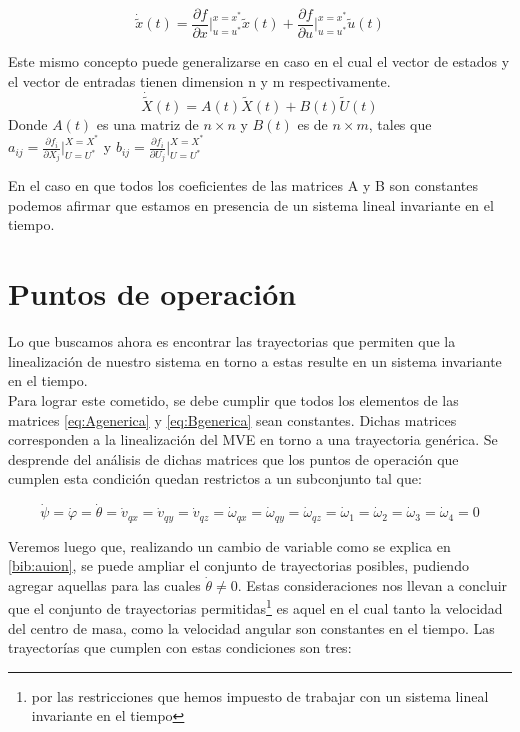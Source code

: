 \documentclass[main]{subfiles}
\begin{document}
\begin{equation}
\dot{\tilde{x}}(t)=\frac{\partial f}{\partial x}\vert_{u=u^*}^{x=x^*}\tilde{x}(t)+\frac{\partial f}{\partial u}\vert_{u=u^*}^{x=x^*}\tilde{u}(t)
\end{equation}

Este mismo concepto puede generalizarse en caso en el cual el vector de estados y el vector de entradas tienen dimension n y m respectivamente.
\begin{equation}
\dot{\tilde{X}}(t)=A(t)\tilde{X}(t)+B(t)\tilde{U}(t)
\end{equation}
Donde $A(t)$ es una matriz de $n \times n$ y $B(t)$ es de $n \times m$, tales que $a_{ij}= \frac{\partial f_i}{\partial X_j}\vert_{U=U^*}^{X=X^*}$ y  $b_{ij}= \frac{\partial f_i}{\partial U_j}\vert_{U=U^*}^{X=X^*}$

En el caso en que todos los coeficientes de las matrices A y B son constantes podemos afirmar que estamos en presencia de un sistema lineal invariante en el tiempo. 

\section{Puntos de operaci\'on}
Lo que buscamos ahora es encontrar las trayectorias que permiten que la linealizaci\'on de nuestro sistema en torno a estas resulte en un sistema invariante en el tiempo.\\

Para lograr este cometido, se debe cumplir que todos los elementos de las matrices \ref{eq:Agenerica} y \ref{eq:Bgenerica} sean constantes. Dichas matrices corresponden a la linealizaci\'on del MVE en torno a una trayectoria gen\'erica. Se desprende del an\'alisis de dichas matrices que los puntos de operaci\'on que cumplen esta condici\'on quedan restrictos a un subconjunto tal que: 

\begin{equation}
\dot{\psi}=\dot{\varphi}=\dot{\theta}=\dot{v}_{qx}=\dot{v}_{qy}=\dot{v}_{qz}=\dot{\omega}_{qx}=\dot{\omega}_{qy}=\dot{\omega}_{qz}=\dot{\omega}_1=\dot{\omega}_2=\dot{\omega}_3=\dot{\omega}_4=0
\end{equation}

Veremos luego que, realizando un cambio de variable como se explica en \ref{bib:auion}, se puede ampliar el conjunto de trayectorias posibles, pudiendo agregar aquellas para las cuales $\dot{\theta} \neq 0$. Estas consideraciones nos llevan a concluir que el conjunto de trayectorias permitidas\footnote{por las restricciones que hemos impuesto de trabajar con un sistema lineal invariante en el tiempo} es aquel en el cual tanto la velocidad del centro de masa, como la velocidad angular son constantes en el tiempo. Las trayector\'ias que cumplen con estas condiciones son tres:
\end{document}
